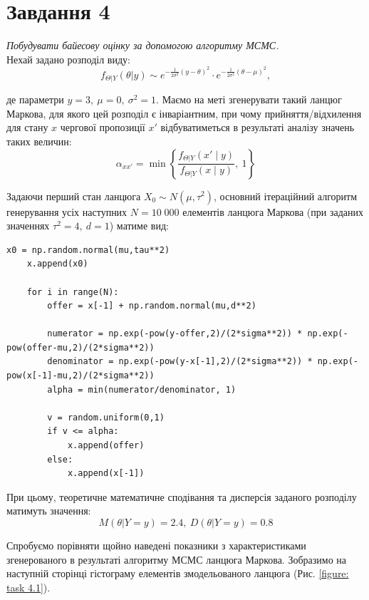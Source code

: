 \documentclass[a4paper,14pt]{extarticle} %
\numberwithin{equation}{section}
\begin{document}
\newpage
\section*{Завдання 4}

\textit{Побудувати байесову оцінку за допомогою алгоритму МСМС.} \\

Нехай задано розподіл виду:
\[ f_{\Theta|Y}(\theta|y)\sim e^{-\frac{1}{2\sigma^2}(y-\theta)^2} \cdot e^{-\frac{1}{2\sigma^2}(\theta-\mu)^2}, \]

де параметри $y=3,\ \mu=0,\ \sigma^2=1$. Маємо на меті згенерувати такий ланцюг Маркова, для якого цей розподіл є інваріантним, при чому прийняття/відхилення для стану $x$ чергової пропозиції $x'$ відбуватиметься в результаті аналізу значень таких величин:
\[ \alpha_{xx'}=\min\left\{\frac{f_{\Theta|Y}(x'\;|\;y)}{f_{\Theta|Y}(x\;|\;y)},\ 1\right\} \] 

Задаючи перший стан ланцюга $X_0\sim N(\mu,\tau^2)$, основний ітераційний алгоритм генерування усіх наступних $N=10\;000$ елементів ланцюга Маркова (при заданих значеннях $\tau^2=4,\ d=1$) матиме вид:

\begin{lstlisting}[firstnumber=1, label = code: task 4, caption = Генерування ланцюга Маркова]
    x0 = np.random.normal(mu,tau**2)
    x.append(x0)

    for i in range(N):
        offer = x[-1] + np.random.normal(mu,d**2)

        numerator = np.exp(-pow(y-offer,2)/(2*sigma**2)) * np.exp(-pow(offer-mu,2)/(2*sigma**2))
        denominator = np.exp(-pow(y-x[-1],2)/(2*sigma**2)) * np.exp(-pow(x[-1]-mu,2)/(2*sigma**2))
        alpha = min(numerator/denominator, 1)

        v = random.uniform(0,1)
        if v <= alpha:
            x.append(offer)
        else:
            x.append(x[-1])
\end{lstlisting}

\vspace{0.4cm}

При цьому, теоретичне математичне сподівання та дисперсія заданого розподілу матимуть значення:
\[ M(\theta|Y=y)=2.4, \ D(\theta|Y=y)=0.8 \]

Спробуємо порівняти щойно наведені показники з характеристиками згенерованого в результаті алгоритму МСМС ланцюга Маркова. Зобразимо на наступній сторінці гістограму елементів змодельованого ланцюга (Рис. \ref{figure: task 4.1}). 
\end{document}
